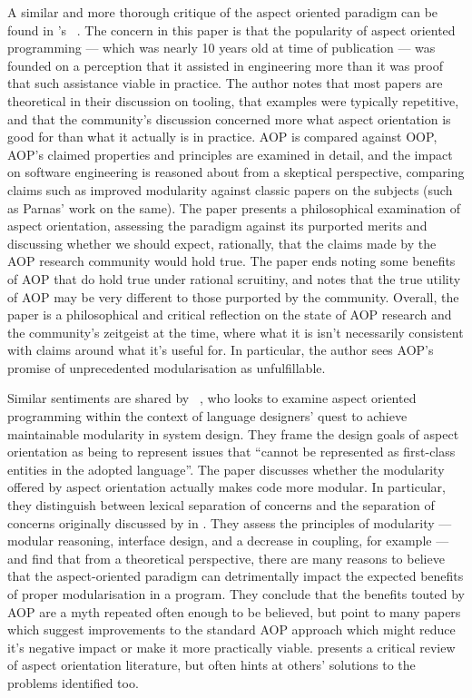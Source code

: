 A similar and more thorough critique of the aspect oriented paradigm can be
found in \citeauthor{steimann06paradoxical}'s
~\cite{steimann06paradoxical}. The concern in
this paper is that the popularity of aspect oriented programming --- which was
nearly 10 years old at time of publication --- was founded on a perception that
it assisted in engineering more than it was proof that such assistance viable in
practice. The author notes that most papers are theoretical in their discussion
on tooling, that examples were typically repetitive, and that the community's
discussion concerned more what aspect orientation is good for than what it
actually is in practice. AOP is compared against OOP, AOP's claimed properties
and principles are examined in detail, and the impact on software engineering is
reasoned about from a skeptical perspective, comparing claims such as improved
modularity against classic papers on the subjects (such as Parnas' work on the
same). The paper presents a philosophical examination of aspect orientation,
assessing the paradigm against its purported merits and discussing whether we
should expect, rationally, that the claims made by the AOP research community
would hold true. The paper ends noting some benefits of AOP that do hold true
under rational scruitiny, and notes that the true utility of AOP may be very
different to those purported by the community. Overall, the paper is a
philosophical and critical reflection on the state of AOP research and the
community's zeitgeist at the time, where what it is isn't necessarily consistent
with claims around what it's useful for. In particular, the author sees AOP's
promise of unprecedented modularisation as unfulfillable. 

Similar sentiments are shared by
\citeauthor{przybylek2010wrong}~\cite{przybylek2010wrong}, who looks to examine aspect oriented
programming within the context of language designers' quest to achieve
maintainable modularity in system design. They frame the design goals of aspect
orientation as being to represent issues that ``cannot be represented as
first-class entities in the adopted language''. The paper discusses whether the
modularity offered by aspect orientation actually makes code more modular. In
particular, they distinguish between lexical separation of concerns and the
separation of concerns originally discussed by
\citeauthor{djikstra_scientific_thought} in
. They assess the principles of
modularity --- modular reasoning, interface design, and a decrease in coupling,
for example --- and find that from a theoretical perspective, there are many
reasons to believe that the aspect-oriented paradigm can detrimentally impact
the expected benefits of proper modularisation in a program. They conclude that
the benefits touted by AOP are a myth repeated often enough to be believed, but
point to many papers which suggest improvements to the standard AOP approach
which might reduce it's negative impact or make it more practically viable.
\citeauthor{przybylek2010wrong} presents a critical review of aspect orientation
literature, but often hints at others' solutions to the problems identified too.



